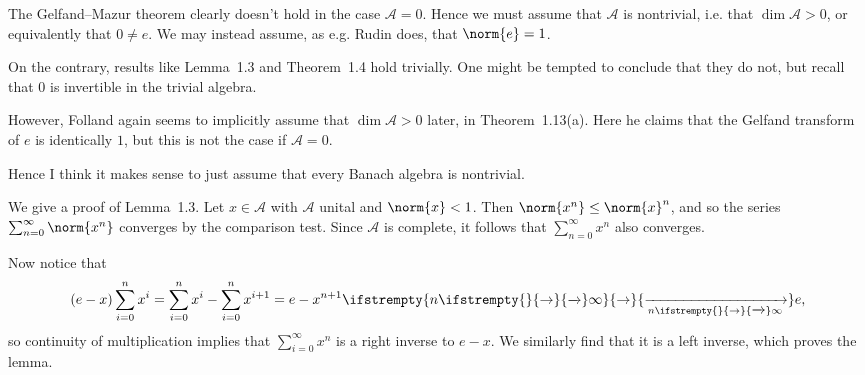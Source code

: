 \documentclass[article, a4paper, 11pt, oneside]{memoir}
\numberwithin{equation}{chapter}
\newcommand{\calA}{\mathcal{A}}
\renewcommand\to[1][]{%
    \ifstrempty{#1}{%
        \rightarrow
    }{%
        \xrightarrow[#1]{}
    }%
}
\begin{document}
\begin{remark}
    The Gelfand--Mazur theorem clearly doesn't hold in the case $\calA = 0$. Hence we must assume that $\calA$ is nontrivial, i.e. that $\dim \calA > 0$, or equivalently that $0 \neq e$. We may instead assume, as e.g. Rudin does, that $\norm{e} = 1$.
    
    On the contrary, results like Lemma~1.3 and Theorem~1.4 hold trivially. One might be tempted to conclude that they do not, but recall that $0$ is invertible in the trivial algebra.

    However, Folland again seems to implicitly assume that $\dim \calA > 0$ later, in Theorem~1.13(a). Here he claims that the Gelfand transform of $e$ is identically $1$, but this is not the case if $\calA = 0$.

    Hence I think it makes sense to just assume that every Banach algebra is nontrivial.
\end{remark}

\begin{remark}
    We give a proof of Lemma~1.3. Let $x \in \calA$ with $\calA$ unital and $\norm{x} < 1$. Then $\norm{x^n} \leq \norm{x}^n$, and so the series $\sum_{n=0}^\infty \norm{x^n}$ converges by the comparison test. Since $\calA$ is complete, it follows that $\sum_{n=0}^\infty x^n$ also converges.

    Now notice that
    \begin{equation*}
        (e-x) \sum_{i=0}^n x^i
            = \sum_{i=0}^n x^i - \sum_{i=0}^n x^{i+1}
            = e - x^{n+1}
            \to[n\to\infty] e,
    \end{equation*}
    so continuity of multiplication implies that $\sum_{i=0}^\infty x^n$ is a right inverse to $e-x$. We similarly find that it is a left inverse, which proves the lemma.
\end{remark}

\newcommand{\ev}{\mathrm{ev}}
\end{document}

